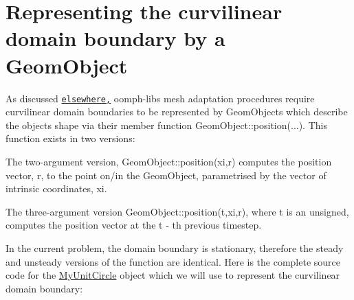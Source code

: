 \hypertarget{index_ellipse}{}\section{Representing the curvilinear domain boundary by a  Geom\+Object}\label{index_ellipse}
As discussed \href{../../../poisson/fish_poisson2/html/index.html}{\tt elsewhere,} {\ttfamily oomph-\/lib\textquotesingle{}s} mesh adaptation procedures require curvilinear domain boundaries to be represented by {\ttfamily Geom\+Objects} which describe the object\textquotesingle{}s shape via their member function {\ttfamily Geom\+Object\+::position}(...). This function exists in two versions\+:
\begin{DoxyItemize}
\item The two-\/argument version, {\ttfamily Geom\+Object\+::position(xi,r)} computes the position vector, {\ttfamily r}, to the point on/in the {\ttfamily Geom\+Object}, parametrised by the vector of intrinsic coordinates, {\ttfamily xi}.
\item The three-\/argument version {\ttfamily Geom\+Object\+::position(t,xi,r)}, where {\ttfamily t} is an {\ttfamily unsigned}, computes the position vector at the {\ttfamily t} -\/ th previous timestep.
\end{DoxyItemize}In the current problem, the domain boundary is stationary, therefore the steady and unsteady versions of the function are identical. Here is the complete source code for the {\ttfamily \hyperlink{classMyUnitCircle}{My\+Unit\+Circle}} object which we will use to represent the curvilinear domain boundary\+:

